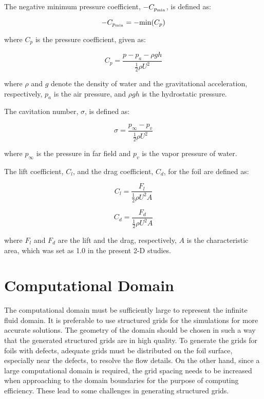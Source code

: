 \documentclass[onecolumn,11pt]{report}
\begin{document}
The negative minimum pressure coefficient, $-C_{p_{\rm min}}$, is defined as:

\begin{equation}
-C_{p_{\rm min}} = -{\rm min}(C_p)
\label{eq20}
\end{equation}

where $C_p$ is the pressure coefficient, given as:

\begin{equation}
C_p = \frac{p-p_a-\rho gh}{\frac{1}{2}\rho U^2}
\label{eq21}
\end{equation}

where $\rho$ and $g$ denote the density of water and the gravitational acceleration, respectively, $p_a$ is the air pressure, and $\rho gh$ is the hydrostatic pressure.

The cavitation number, $\sigma$, is defined as:

\begin{equation}
\sigma = \frac{p_\infty-p_v}{\frac{1}{2}\rho U^2}
\label{eq22}
\end{equation}

where $p_\infty$ is the pressure in far field and $p_v$ is the vapor pressure of water. 

The lift coefficient, $C_l$, and the drag coefficient, $C_d$, for the foil are defined as: 

\begin{equation}
C_l = \frac{F_l}{\frac{1}{2}\rho U^2 A}
\label{eq23}
\end{equation}

\begin{equation}
C_d = \frac{F_d}{\frac{1}{2}\rho U^2 A}
\label{eq23-1}
\end{equation}

where $F_l$ and $F_d$ are the lift and the drag, respectively, $A$ is the characteristic area, which was set as 1.0 in the present 2-D studies. 


\section{Computational Domain}

The computational domain must be sufficiently large to represent the infinite fluid domain. It is preferable to use structured grids for the simulations for more accurate solutions. The geometry of the domain should be chosen in such a way that the generated structured grids are in high quality. To generate the grids for foils with defects, adequate grids must be distributed on the foil surface, especially near the defects, to resolve the flow details. On the other hand, since a large computational domain is required,  the grid spacing needs to be increased when approaching to the domain boundaries for the purpose of computing efficiency. These lead to some challenges in generating structured grids.  
\end{document}
